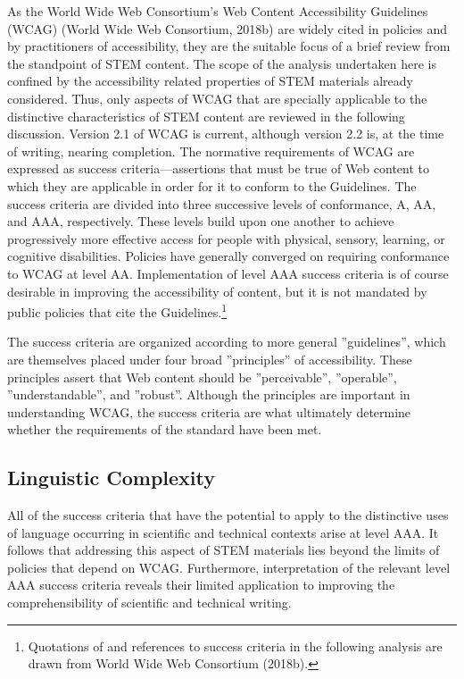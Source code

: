 \documentclass{sig-alternate} %
\begin{document}
\begin{large}
As the World Wide Web Consortium’s Web Content Accessibility Guidelines (WCAG) (World Wide Web Consortium, 2018b) are widely cited in policies and by practitioners of accessibility, they are the suitable focus of a brief review from the standpoint of STEM content. The scope of the analysis undertaken here is confined by the accessibility related properties of STEM materials already considered. Thus, only aspects of WCAG that are specially applicable to the distinctive characteristics of STEM content are reviewed in the following discussion. Version 2.1 of WCAG is current, although version 2.2 is, at the time of writing, nearing completion. The normative requirements of WCAG are expressed as success criteria—assertions that must be true of Web content to which they are applicable in order for it to conform to the Guidelines. The success criteria are divided into three successive levels of conformance, A, AA, and AAA, respectively. These levels build upon one another to achieve progressively more effective access for people with physical, sensory, learning, or cognitive disabilities. Policies have generally converged on requiring conformance to WCAG at level AA. Implementation of level AAA success criteria is of course desirable in improving the accessibility of content, but it is not mandated by public policies that cite the Guidelines.\footnote{Quotations of and references to success criteria in the following analysis are drawn from World Wide Web Consortium (2018b).}

The success criteria are organized according to more general ”guidelines”, which are themselves placed under four broad ”principles” of accessibility. These principles assert that Web content should be ”perceivable”, ”operable”, ”understandable”, and ”robust”. Although the principles are important in understanding WCAG, the success criteria are what ultimately determine whether the requirements of the standard have been met.

\subsection*{Linguistic Complexity}

All of the success criteria that have the potential to apply to the distinctive uses of language occurring in scientific and technical contexts arise at level AAA. It follows that addressing this aspect of STEM materials lies beyond the limits of policies that depend on WCAG. Furthermore, interpretation of the relevant level AAA success criteria reveals their limited application to improving the comprehensibility of scientific and technical writing.


\end{large}
\end{document}
